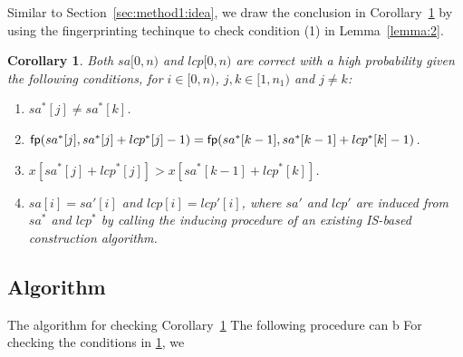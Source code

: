 \documentclass[10pt,journal,compsoc]{IEEEtran}
\newtheorem{Corollary}{Corollary}
\begin{document}
Similar to Section~\ref{sec:method1:idea}, we draw the conclusion in Corollary~\ref{corollary:2} by using the fingerprinting techinque to check condition (1) in Lemma~\ref{lemma:2}. 

\begin{Corollary} \label{corollary:2}
Both $sa[0, n)$ and $lcp[0, n)$ are correct with a high probability given the following conditions, for $i \in [0, n)$, $j, k \in [1, n_1)$ and $j \ne k$:
	
\begin{enumerate}[(1)]
	\item 
	$sa^*[j] \ne sa^*[k]$. 
	\item
	${\sf fp}(sa^*[j], sa^*[j] + lcp^*[j] - 1) = {\sf fp}(sa^*[k - 1], sa^*[k - 1] + lcp^*[k] - 1)$.
	\item
	$x[sa^*[j] + lcp^*[j]] > x[sa^*[k - 1] + lcp^*[k]]$.
	\item 
	$sa[i] = sa'[i]$ and $lcp[i] = lcp'[i]$, where $sa'$ and $lcp'$ are induced from $sa^*$ and $lcp^*$ by calling the inducing procedure of an existing IS-based construction algorithm.
\end{enumerate}

\end{Corollary}


\subsection{Algorithm} \label{sec:method2:algorithm}

The algorithm for checking Corollary~\ref{corollary:2} 	
The following procedure can b
For checking the conditions in \ref{corollary:2}, we
\end{document}
